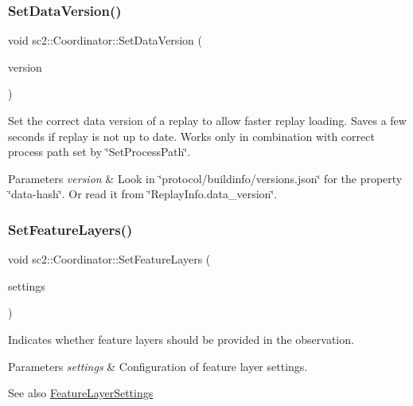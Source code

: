\subsubsection{\texorpdfstring{Set\+Data\+Version()}{SetDataVersion()}}
{\footnotesize\ttfamily void sc2\+::\+Coordinator\+::\+Set\+Data\+Version (\begin{DoxyParamCaption}\item[{const std\+::string \&}]{version }\end{DoxyParamCaption})}

Set the correct data version of a replay to allow faster replay loading. Saves a few seconds if replay is not up to date. Works only in combination with correct process path set by \char`\"{}\+Set\+Process\+Path\char`\"{}. 
\begin{DoxyParams}{Parameters}
{\em version} & Look in \char`\"{}protocol/buildinfo/versions.\+json\char`\"{} for the property \char`\"{}data-\/hash\char`\"{}. Or read it from \char`\"{}\+Replay\+Info.\+data\+\_\+version\char`\"{}. \\
\hline
\end{DoxyParams}
\mbox{\label{classsc2_1_1_coordinator_ab46aec5712f6ec8ef12b03854f6e0495}} 
\subsubsection{\texorpdfstring{Set\+Feature\+Layers()}{SetFeatureLayers()}}
{\footnotesize\ttfamily void sc2\+::\+Coordinator\+::\+Set\+Feature\+Layers (\begin{DoxyParamCaption}\item[{const \hyperlink{structsc2_1_1_feature_layer_settings}{Feature\+Layer\+Settings} \&}]{settings }\end{DoxyParamCaption})}

Indicates whether feature layers should be provided in the observation. 
\begin{DoxyParams}{Parameters}
{\em settings} & Configuration of feature layer settings. \\
\hline
\end{DoxyParams}
\begin{DoxySeeAlso}{See also}
\hyperlink{structsc2_1_1_feature_layer_settings}{Feature\+Layer\+Settings} 
\end{DoxySeeAlso}
\mbox{\label{classsc2_1_1_coordinator_a555587bc85ac437711d15b569c75181a}} 
